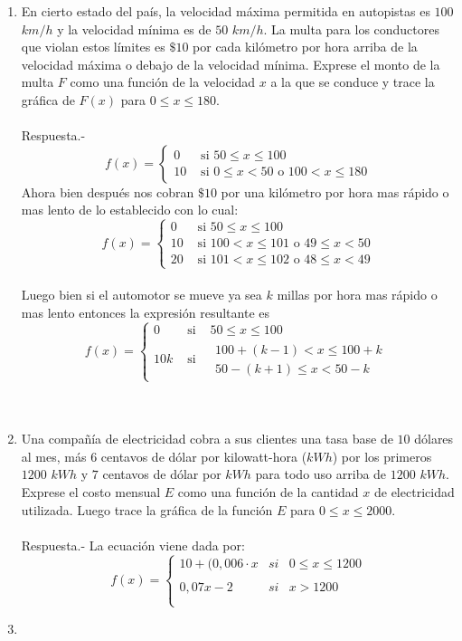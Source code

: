 \begin{enumerate}
    \item En cierto estado del país, la velocidad máxima permitida en autopistas es $100$ $km/h$ y la velocidad mínima es de $50$ $km/h$. La multa para los conductores que violan estos límites es $\$ 10$ por cada kilómetro por hora arriba de la velocidad máxima o debajo de la velocidad mínima. Exprese el monto de la multa $F$ como una función de la velocidad $x$ a la que se conduce y trace la gráfica de $F(x)$ para $0 \leq  x \leq 180$.\\\\
	Respuesta.-\; \[f(x)=\left\{\begin{matrix}0&\text{ si } 50\leq x\leq100\\10&\text{ si } 0\leq x < 50 \text{ o } 100< x\leq 180 \end{matrix}\right.\]
	 Ahora bien después nos cobran $\$ 10$ por una kilómetro por hora mas rápido o mas lento de lo establecido con lo cual:
\[f(x)=\left\{\begin{matrix}0&\text{ si } 50\leq x\leq 100\\10 &\text{ si } 100<x\leq101 \text{ o } 49\leq x<50\\ 20&\text{ si } 101<x\leq 102 \text{ o } 48\leq x < 49\end{matrix}\right.\] \\
	Luego bien si el automotor se mueve ya sea $k$ millas por hora mas rápido o mas lento entonces la expresión resultante es
	\[f(x)=\left\{\begin{matrix}0&\text{ si }& 50\leq x\leq100\\10k&\text{ si }&\begin{matrix}100+(k-1)<x\leq100+k\\50-(k+1)\leq x<50-k\end{matrix}\end{matrix}\right.\]\\\\
    
    \item  Una compañía de electricidad cobra a sus clientes una tasa base de $10$ dólares al mes, más $6$ centavos de dólar por kilowatt-hora ($kWh$) por los primeros $1200$ $kWh$ y $7$ centavos de dólar por $kWh$ para todo uso arriba de $1200$ $kWh$. Exprese el costo mensual $E$ como una función de la cantidad $x$ de electricidad utilizada. Luego trace la gráfica de la función $E$ para $0 \leq x \leq 2000.$\\\\
	Respuesta.-\; La ecuación viene dada por:
	\[f(x) = \left\{ \begin{array}{rcl} 
	    10 + (0,006\cdot x&si&0\leq x \leq 1200\\
	    \\ 0,07x - 2&si&x>1200\\\\
	\end{array}\right. \]

    \item 



    \end{enumerate}
